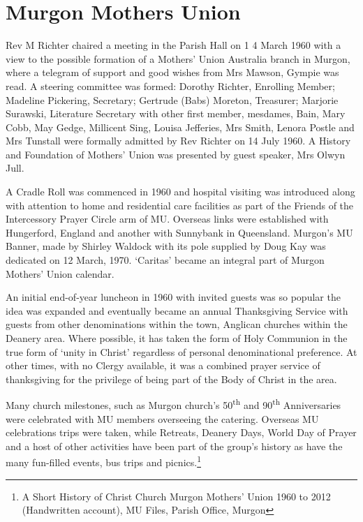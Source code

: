 \section{Murgon Mothers Union}



Rev M Richter chaired a meeting in the Parish Hall on 1 4 March 1960 with a view to the possible formation of a Mothers' Union Australia branch in Murgon, where a telegram of support and good wishes from Mrs Mawson, Gympie was read. A steering committee was formed: Dorothy Richter, Enrolling Member; Madeline Pickering, Secretary; Gertrude (Babs) Moreton, Treasurer; Marjorie Surawski, Literature Secretary with other first member, mesdames, Bain, Mary Cobb, May Gedge, Millicent Sing, Louisa Jefferies, Mrs Smith, Lenora Postle and Mrs Tunstall were formally admitted by Rev Richter on 14 July 1960. A History and Foundation of Mothers' Union was presented by guest speaker, Mrs Olwyn Jull.



A Cradle Roll was commenced in 1960 and hospital visiting was introduced along with attention to home and residential care facilities as part of the Friends of the Intercessory Prayer Circle arm of MU. Overseas links were established with Hungerford, England and another with Sunnybank in Queensland. Murgon's MU Banner, made by Shirley Waldock with its pole supplied by Doug Kay was dedicated on 12 March, 1970. `Caritas' became an integral part of Murgon Mothers' Union calendar.



An initial end-of-year luncheon in 1960 with invited guests was so popular the idea was expanded and eventually became an annual Thanksgiving Service with guests from other denominations within the town, Anglican churches within the Deanery area. Where possible, it has taken the form of Holy Communion in the true form of `unity in Christ' regardless of personal denominational preference. At other times, with no Clergy available, it was a combined prayer service of thanksgiving for the privilege of being part of the Body of Christ in the area.



Many church milestones, such as Murgon church's 50\textsuperscript{th} and 90\textsuperscript{th} Anniversaries were celebrated with MU members overseeing the catering. Overseas MU celebrations trips were taken, while Retreats, Deanery Days, World Day of Prayer and a host of other activities have been part of the group's history as have the many fun-filled events, bus trips and picnics.\footnote{A Short History of Christ Church Murgon Mothers' Union 1960 to 2012 (Handwritten account), MU Files, Parish Office, Murgon}


